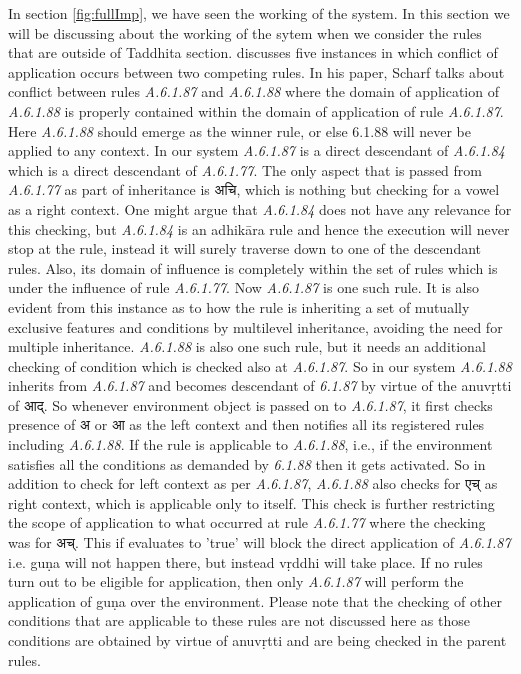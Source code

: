 \documentclass[a4paper,11pt,twoside,openright]{report}
\begin{document}
In section \ref{fig:fullImp}, we have seen the working of the system. In this section we will be discussing about the working of the sytem when we consider the rules that are outside of Taddhita section.  discusses five instances in which conflict of application occurs between two competing rules. In his paper, Scharf talks about conflict between rules \textsl{ A.6.1.87 } and \textsl{ A.6.1.88} where the domain of application of \textsl{ A.6.1.88} is properly contained within the domain of application of rule \textsl{ A.6.1.87}. Here \textsl{ A.6.1.88} should emerge as the winner rule, or else 6.1.88 will never be applied to any context. In our system \textsl{ A.6.1.87} is a direct descendant of \textsl{ A.6.1.84} which is a direct descendant of \textsl{ A.6.1.77}. The only aspect that is passed from \textsl{ A.6.1.77} as part of inheritance is {\skt अचि}, which is nothing but checking for a vowel as a right context. One might argue that \textsl{ A.6.1.84} does not have any relevance for this checking, but \textsl{ A.6.1.84} is an adhikāra rule and hence the execution will never stop at the rule, instead it will surely traverse down to one of the descendant rules. Also, its domain of influence is completely within the set of rules which is under the influence of rule \textsl{ A.6.1.77}. Now \textsl{ A.6.1.87} is one such rule. It is also evident from this instance as to how the rule is inheriting a set of mutually exclusive features and conditions by multilevel inheritance, avoiding the need for multiple inheritance. \textsl{ A.6.1.88} is also one such rule, but it needs an additional checking of condition which is checked also at \textsl{ A.6.1.87}. So in our system \textsl{ A.6.1.88} inherits from \textsl{ A.6.1.87} and becomes descendant of \textsl{ 6.1.87} by virtue of the anuvṛtti of {\skt आद्}. So whenever environment object is passed on to \textsl{ A.6.1.87}, it first checks presence of {\skt अ or आ} as the left context and then notifies all its registered rules including \textsl{ A.6.1.88}. If the rule is applicable to \textsl{ A.6.1.88}, i.e., if the environment satisfies all the conditions as demanded by \textsl{ 6.1.88} then it gets activated. So in addition to check for left context as per \textsl{ A.6.1.87}, \textsl{ A.6.1.88} also checks for {\skt एच्} as right context, which is applicable only to itself. This check is further restricting the scope of application to what occurred at rule \textsl{ A.6.1.77} where the checking was for {\skt अच्}.  This if evaluates to 'true' will block the direct application of \textsl{ A.6.1.87} i.e. guṇa will not happen there, but instead vṛddhi  will take place. If no rules turn out to be eligible for application, then only \textsl{ A.6.1.87} will perform the application of guṇa over the environment. Please note that the checking of other conditions that are applicable to these rules are not discussed here as those conditions are obtained by virtue of anuvṛtti and are being checked in the parent rules.
\end{document}
